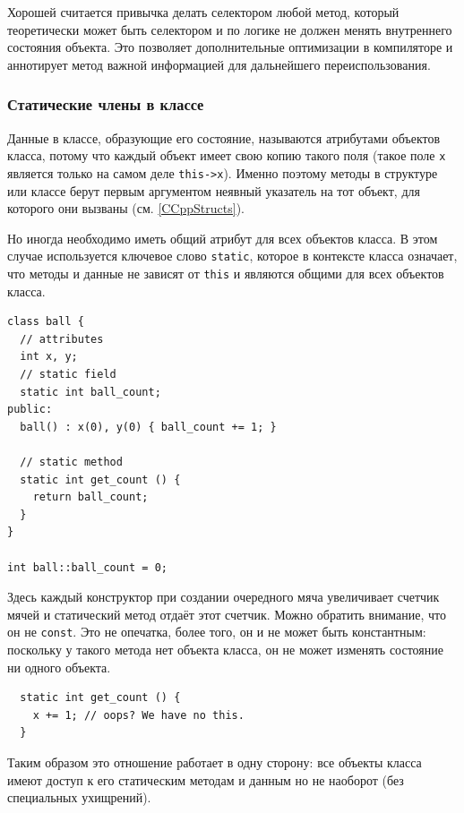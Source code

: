 \documentclass[a4paper,12pt,oneside]{article}
\begin{document}
Хорошей считается привычка делать селектором любой метод, который теоретически может быть селектором и по логике не должен менять внутреннего состояния объекта. Это позволяет дополнительные оптимизации в компиляторе и аннотирует  метод важной информацией для дальнейшего переиспользования.

\subsubsection{Статические члены в классе}\label{StaticMembers}

Данные в классе, образующие его состояние, называются атрибутами объектов класса, потому что каждый объект имеет свою копию такого поля (такое поле \lstinline!x! является только на самом деле \lstinline!this->x!). Именно поэтому методы в структуре или классе берут первым аргументом неявный указатель на тот объект, для которого они вызваны (см. \ref{CCppStructs}).

Но иногда необходимо иметь общий атрибут для всех объектов класса. В этом случае используется ключевое слово \lstinline!static!, которое в контексте класса означает, что методы и данные не зависят от \lstinline!this! и являются общими для всех объектов класса.

\begin{lstlisting}
class ball {
  // attributes
  int x, y;
  // static field
  static int ball_count;
public: 
  ball() : x(0), y(0) { ball_count += 1; }

  // static method
  static int get_count () { 
    return ball_count; 
  }
}

int ball::ball_count = 0;
\end{lstlisting}

Здесь каждый конструктор при создании очередного мяча увеличивает счетчик мячей и статический метод отдаёт этот счетчик. Можно обратить внимание, что он не \lstinline!const!. Это не опечатка, более того, он и не может быть константным: поскольку у такого метода нет объекта класса, он не может изменять состояние ни одного объекта.

\begin{lstlisting}
  static int get_count () { 
    x += 1; // oops? We have no this.
  }
\end{lstlisting}

Таким образом это отношение работает в одну сторону: все объекты класса имеют доступ к его статическим методам и данным но не наоборот (без специальных ухищрений).
\end{document}
